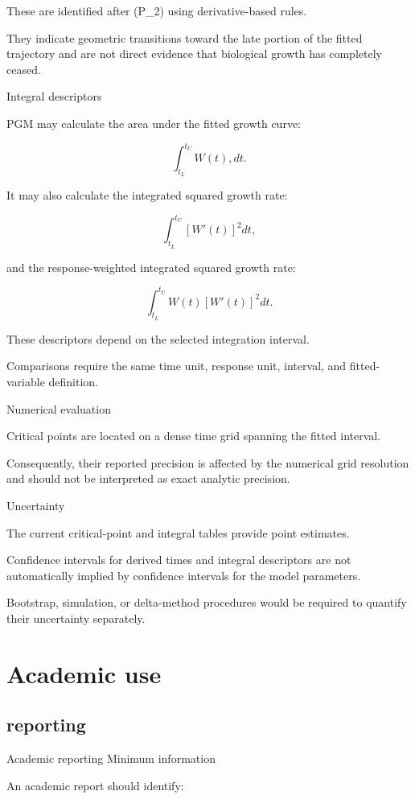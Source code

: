 \documentclass[
  english,
  letterpaper,
  DIV=11,
  numbers=noendperiod]{scrreprt}
\begin{document}
These are identified after (P\_2) using derivative-based rules.

They indicate geometric transitions toward the late portion of the
fitted trajectory and are not direct evidence that biological growth has
completely ceased.

Integral descriptors

PGM may calculate the area under the fitted growth curve:

\[
\int_{t_L}^{t_U} W(t),dt.
\]

It may also calculate the integrated squared growth rate:

\[
\int_{t_L}^{t_U}
\left[W'(t)\right]^2dt,
\]

and the response-weighted integrated squared growth rate:

\[
\int_{t_L}^{t_U}
W(t)\left[W'(t)\right]^2dt.
\]

These descriptors depend on the selected integration interval.

Comparisons require the same time unit, response unit, interval, and
fitted-variable definition.

Numerical evaluation

Critical points are located on a dense time grid spanning the fitted
interval.

Consequently, their reported precision is affected by the numerical grid
resolution and should not be interpreted as exact analytic precision.

Uncertainty

The current critical-point and integral tables provide point estimates.

Confidence intervals for derived times and integral descriptors are not
automatically implied by confidence intervals for the model parameters.

Bootstrap, simulation, or delta-method procedures would be required to
quantify their uncertainty separately.

\part{Academic use}

\chapter{reporting}\label{reporting}

Academic reporting Minimum information

An academic report should identify:
\end{document}
